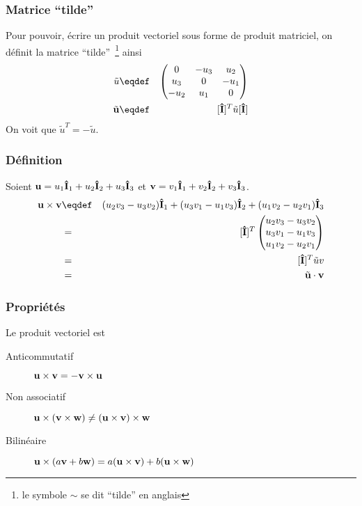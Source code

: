 \subsubsection{Matrice ``tilde''}
Pour pouvoir, écrire un produit vectoriel sous forme de produit matriciel, on définit la matrice ``tilde''~\footnote{le symbole $\sim$ se dit ``tilde'' en anglais} ainsi
\begin{eqnarray*}
	\tilde{u} & \eqdef & \begin{pmatrix}0 & -u_3 & u_2\\ u_3 & 0 & -u_1\\ -u_2 & u_1 & 0\end{pmatrix}\\
	\tilde{\fv{u}} & \eqdef & [\ui]^T \tilde{u} [\ui]
\end{eqnarray*}
On voit que $\tilde{u}^T = -\tilde{u}$.

\subsubsection{Définition}
Soient ${\bf u} = u_1{\bf\hat{I}}_1 + u_2{\bf\hat{I}}_2 + u_3{\bf\hat{I}}_3$ et ${\bf v} = v_1{\bf\hat{I}}_1 + v_2{\bf\hat{I}}_2 + v_3{\bf\hat{I}}_3$.
\begin{eqnarray*}
	\fv{u}\times\fv{v} & \eqdef & (u_2v_3 - u_3v_2) \ui_1 + (u_3v_1 - u_1v_3) \ui_2 + (u_1v_2 - u_2v_1) \ui_3\\
	& = & [\ui]^T \begin{pmatrix}u_2v_3 - u_3v_2 \\ u_3v_1 - u_1v_3 \\ u_1v_2 - u_2v_1\end{pmatrix}\\
	& = & [\ui]^T \tilde{u}v\\
	& = & \tilde{\fv{u}}\cdot\fv{v}
\end{eqnarray*}

\subsubsection{Propriétés}
Le produit vectoriel est
\begin{description}
	\item[Anticommutatif] ${\bf u} \times {\bf v} = - {\bf v} \times {\bf u}$
	\item[Non associatif] ${\bf u} \times ({\bf v} \times {\bf w}) \neq ({\bf u} \times {\bf v}) \times {\bf w}$
	\item[Bilinéaire] ${\bf u} \times (a{\bf v} + b{\bf w}) = a ({\bf u} \times {\bf v}) + b ({\bf u} \times {\bf w})$
\end{description}

